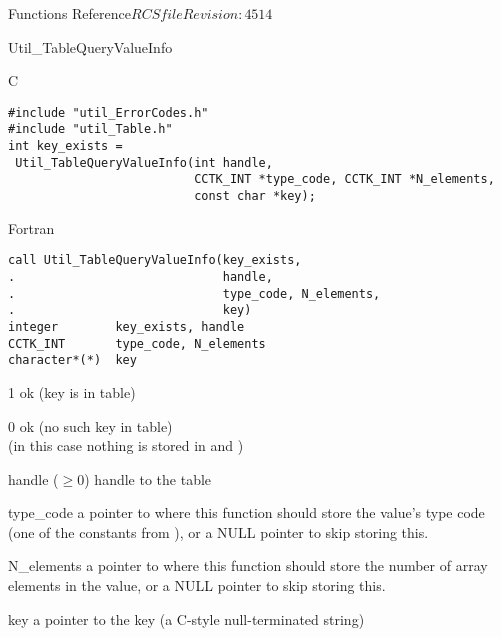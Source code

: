 \begin{cactuspart}{ Functions Reference}{$RCSfile$}{$Revision: 4514 $}
\begin{FunctionDescription}{Util\_TableQueryValueInfo}
\begin{SynopsisSection}
\begin{Synopsis}{C}
\begin{verbatim}
#include "util_ErrorCodes.h"
#include "util_Table.h"
int key_exists =
 Util_TableQueryValueInfo(int handle,
                          CCTK_INT *type_code, CCTK_INT *N_elements,
                          const char *key);
\end{verbatim}
\end{Synopsis}
\begin{Synopsis}{Fortran}
\begin{verbatim}
call Util_TableQueryValueInfo(key_exists,
.                             handle,
.                             type_code, N_elements,
.                             key)
integer        key_exists, handle
CCTK_INT       type_code, N_elements
character*(*)  key
\end{verbatim}
\end{Synopsis}
\end{SynopsisSection}

\begin{ResultSection}
\begin{Result}{\rm 1}
ok (key is in table)
\end{Result}
\begin{Result}{\rm 0}
ok (no such key in table)\\
(in this case nothing is stored in  and )
\end{Result}
\end{ResultSection}

\begin{ParameterSection}
\begin{Parameter}{handle ($\ge 0$)}
handle to the table
\end{Parameter}
\begin{Parameter}{type\_code}
a pointer to where this function should store the value's type code
(one of the  constants from ),
or a NULL pointer to skip storing this.
\end{Parameter}
\begin{Parameter}{N\_elements}
a pointer to where this function should store
the number of array elements in the value,
or a NULL pointer to skip storing this.
\end{Parameter}
\begin{Parameter}{key}
a pointer to the key (a C-style null-terminated string)
\end{Parameter}
\end{ParameterSection}


\end{FunctionDescription}
\end{cactuspart}
